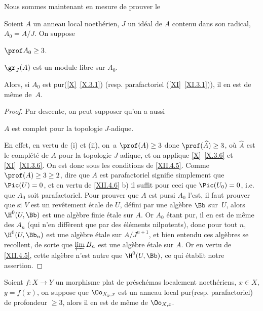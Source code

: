 Nous sommes maintenant en mesure de prouver le
\enlargethispage{-1\baselineskip}%
\begin{theoreme} \label{XII.4.7}
Soient $A$ un anneau local noeth\'erien, $J$ un id\'eal de $A$ contenu dans son radical, $A_0=A/J$. On suppose
\begin{enumeratei}
\item
$\prof A_0\geq 3$.
\item
$\gr_J(A)$ est un module libre sur $A_0$.
\end{enumeratei}
\noindent
Alors, si $A_0$ est \og pur\fg (\ref{X}~\ref{X.3.1}) (resp. parafactoriel (\ref{XI}~\ref{XI.3.1})), il en est de m\^eme de~$A$.
\end{theoreme}

\begin{proof}
Par descente, on peut supposer qu'on a aussi
\begin{enumeratei}\setcounter{enumi}{2}
\item
$A$ est complet pour la topologie $J$-adique.
\end{enumeratei}

En effet, en vertu de (i) et (ii), on~a $\prof(A)\geq 3$ donc $\prof(\widehat{A})\geq 3$, o\`u $\widehat{A}$ est le compl\'et\'e de $A$ pour la topologie $J$-adique, et on applique \ref{X}~\ref{X.3.6} et \ref{XI}~\ref{XI.3.6}. On est donc sous les conditions de \ref{XII.4.5}. Comme $\prof(A)\geq 3\geq 2$, dire que $A$ est parafactoriel signifie simplement que $\Pic(U)=0$, et en vertu de \ref{XII.4.6} b) il suffit pour ceci que $\Pic(U_0)=0$, i.e. que $A_0$ soit parafactoriel. Pour prouver que $A$ est \og pur\fg si $A_0$ l'est, il faut prouver que si $V$ est un rev\^etement \'etale de $U$, d\'efini par une alg\`ebre $\Bb$ sur~$U$, alors $\H^0(U, \Bb)$ est une alg\`ebre finie \'etale sur $A$. Or $A_0$ \'etant pur, il en est de m\^eme des $A_n$ (qui n'en diff\`erent que par des \'el\'ements nilpotents), donc pour tout $n$, $\H^0(U, \Bb_n)$ est une alg\`ebre \'etale sur $A/J^{n+1}$, et bien entendu ces alg\`ebres se recollent, de sorte que $\varprojlim B_n$ est une alg\`ebre \'etale sur $A$. Or en vertu de \ref{XII.4.5}, cette alg\`ebre n'est autre que $\H^0(U, \Bb)$, ce qui \'etablit notre assertion.
\skipqed
\end{proof}

\begin{corollaire} \label{XII.4.8}
Soient $f:X\to Y$ un morphisme plat de pr\'esch\'emas localement noeth\'eriens, $x\in X$, $y=f(x)$, on suppose que $\Oo_{X_y, x}$ est un anneau local \og pur\fg (resp. parafactoriel) de profondeur $\geq 3$, alors il en est de m\^eme de $\Oo_{X, x}$.
\end{corollaire}

